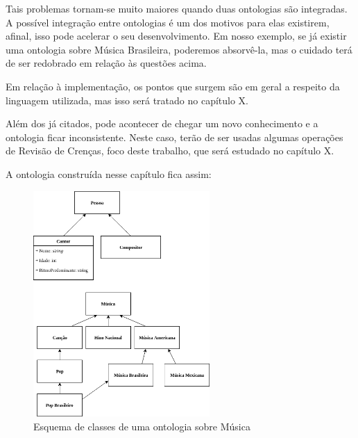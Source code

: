 	Tais problemas tornam-se muito maiores quando duas ontologias são integradas. A possível integração entre ontologias é um dos motivos para elas existirem, afinal, isso pode acelerar o seu desenvolvimento. Em nosso exemplo, se já existir uma ontologia sobre Música Brasileira, poderemos absorvê-la, mas o cuidado terá de ser redobrado em relação às questões acima. 
	
	Em relação à implementação, os pontos que surgem são em geral a respeito da linguagem utilizada, mas isso será tratado no capítulo {\color{red} X}.
	
	Além dos já citados, pode acontecer de chegar um novo conhecimento e a ontologia ficar inconsistente. Neste caso, terão de ser usadas algumas operações de Revisão de Crenças, foco deste trabalho, que será estudado no capítulo {\color{red} X}.
	
	A ontologia construída nesse capítulo fica assim: 
	
	\begin{figure}[H]
		\centering
		\includegraphics[width=0.6\textwidth]{Capitulos/Ontologias/OntologiaMusica}
		\caption{Esquema de classes de uma ontologia sobre Música}
	\end{figure}
	